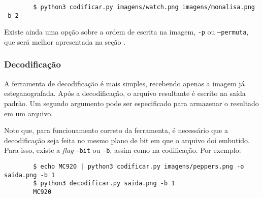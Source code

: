     \begin{verbatim}
        $ python3 codificar.py imagens/watch.png imagens/monalisa.png -b 2
    \end{verbatim}

    Existe ainda uma opção sobre a ordem de escrita na imagem, \texttt{-p} ou \texttt{--permuta}, que será melhor apresentada na seção .

    \subsubsection{Decodificação}

    A ferramenta de decodificação é mais simples, recebendo apenas a imagem já esteganografada. Após a decodificação, o arquivo resultante é escrito na saída padrão. Um segundo argumento pode ser especificado para armazenar o resultado em um arquivo.

    Note que, para funcionamento correto da ferramenta, é necessário que a decodificação seja feita no mesmo plano de bit em que o arquivo doi embutido. Para isso, existe a \textit{flag} \texttt{--bit} ou \texttt{-b}, assim como na codificação. Por exemplo:

    \begin{verbatim}
        $ echo MC920 | python3 codificar.py imagens/peppers.png -o saida.png -b 1
        $ python3 decodificar.py saida.png -b 1
        MC920
    \end{verbatim}
